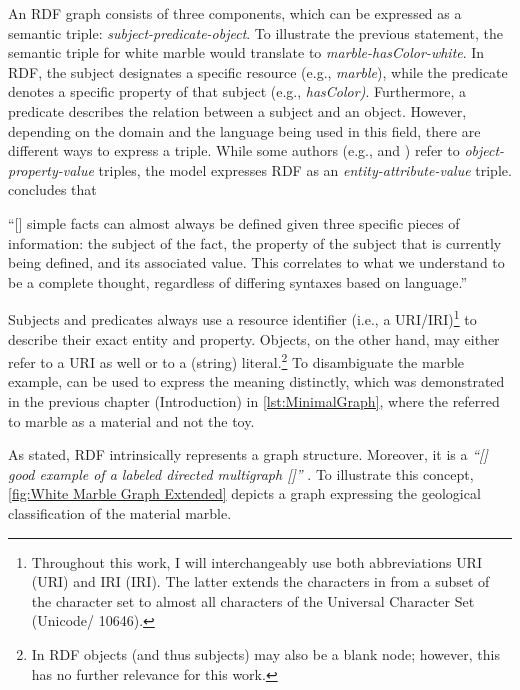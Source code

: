 An \acrshort*{RDF} graph consists of three components, which can be expressed as a semantic triple: \textit{subject-predicate-object}. To illustrate the previous statement, the semantic triple for white marble would translate to \textit{marble-hasColor-white}. In \acrshort*{RDF}, the subject designates a specific resource (e.g., \textit{marble}), while the predicate denotes a specific property of that subject (e.g., \textit{hasColor)}. Furthermore, a predicate describes the relation between a subject and an object. However, depending on the domain and the language being used in this field, there are different ways to express a triple. While some authors (e.g., \cite[115]{Fensel2005} and \cite[581]{Khosrow2006}) refer to \textit{object-property-value} triples, the  model expresses \acrshort*{RDF} as an \textit{entity-attribute-value} triple. \textcite[17]{Powers2003} concludes that


\begin{displayquote}
\hspace*{-1.4mm}``[\textellipsis{}] simple facts can almost always be defined given three specific pieces of information: the subject of the fact, the property of the subject that is currently being defined, and its associated value. This correlates to what we understand to be a complete thought, regardless of differing syntaxes based on language.''
\end{displayquote}

\noindent Subjects and predicates always use a resource identifier (i.e., a \acrshort*{URI}/\acrshort*{IRI})\footnote{Throughout this work, I will interchangeably use both abbreviations \acrshort*{URI} (\acrlong*{URI}) and \acrshort*{IRI} (\acrlong*{IRI}). The latter extends the characters in  from a subset of the  character set to almost all characters of the Universal Character Set (Unicode/ 10646).} to describe their exact entity and property. Objects, on the other hand, may either refer to a \acrshort*{URI} as well or to a (string) literal.\footnote{In \acrshort*{RDF} objects (and thus subjects) may also be a blank node; however, this has no further relevance for this work.}
To disambiguate the marble example,  can be used to express the meaning distinctly, which was demonstrated in the previous chapter (Introduction) in \autoref{lst:MinimalGraph}, where the  referred to marble as a material and not the toy.

As stated, \acrshort*{RDF} intrinsically represents a graph structure. Moreover, it is a \textit{``[\textellipsis{}] good example of a labeled directed multigraph [\textellipsis{}]''} \parencite[21]{Shaposhnik2015}. To illustrate this concept, \autoref{fig:White Marble Graph Extended} depicts a graph expressing the geological classification of the material marble.

